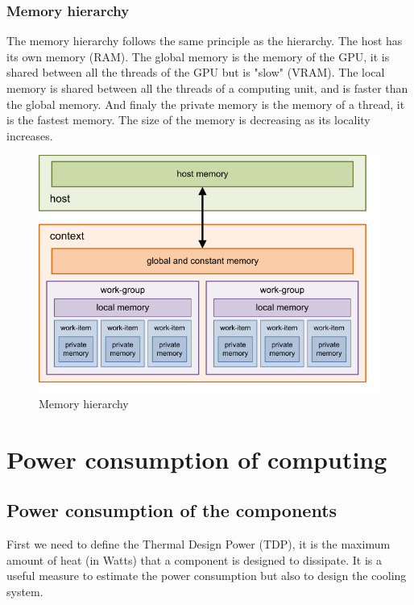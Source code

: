\documentclass[12pt, openany]{report}
\theoremstyle{definition}
\begin{document}
\subsection{Memory hierarchy}
The memory hierarchy follows the same principle as the hierarchy. The host has its own memory (RAM). The global memory is the memory of the GPU, it is shared between all the threads of the GPU but is "slow" (VRAM). The local memory is shared between all the threads of a computing unit, and is faster than the global memory. And finaly the private memory is the memory of a thread, it is the fastest memory. The size of the memory is decreasing as its locality increases.\\
\begin{figure}[H]
	\centering
	\includegraphics[width=0.8\linewidth]{img/mem_GPU.png}
	\caption{Memory hierarchy}
	\label{fig:mem_GPU}
\end{figure}
\chapter{Power consumption of computing}
\section{Power consumption of the components}
First we need to define the Thermal Design Power (TDP), it is the maximum amount of heat (in Watts) that a component is designed to dissipate. It is a useful measure to estimate the power consumption but also to design the cooling system.\\
\end{document}
